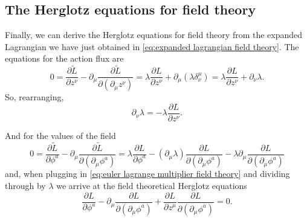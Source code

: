 \documentclass[../main.tex]{subfiles}
\begin{document}
\subsection{The Herglotz equations for field theory}
Finally, we can derive the Herglotz equations for field theory from the expanded
Lagrangian we have just obtained in \cref{eq:expanded lagrangian field theory}. The
equations for the action flux are
\begin{equation*}
	0 = \frac{\partial \tilde{L}}{\partial z^\nu} - \partial_\mu \frac{\partial
	\tilde{L}}{\partial(\partial_\mu z^\nu)} = \lambda \frac{\partial L}{\partial z^\nu} +
	\partial_\mu(\lambda \delta_\nu^\mu) = \lambda \frac{\partial L}{\partial z^\nu} +
	\partial_\nu \lambda.
\end{equation*}
So, rearranging,
\begin{equation} \label{eq:euler lagrange multiplier field theory}
	\partial_\nu \lambda = - \lambda \frac{\partial L}{\partial z^\nu}. 
\end{equation}

And for the values of the field
\begin{equation*}
	0 = \frac{\partial \tilde{L}}{\partial \phi^a} - \partial_\mu \frac{\partial
	\tilde{L}}{\partial(\partial_\mu \phi^a)} = \lambda \frac{\partial L}{\partial \phi^a} -
	(\partial_\mu \lambda) \frac{\partial L}{\partial (\partial_\mu \phi^a) } - \lambda
	\partial_\mu \frac{\partial L}{\partial (\partial_\mu \phi^a) }
\end{equation*}
and, when plugging in \cref{eq:euler lagrange multiplier field theory} and dividing
through by \( \lambda \) we arrive at the field theoretical Herglotz equations
\begin{equation} \label{eq:}
	\frac{\partial L}{\partial \phi^a} - \partial_\mu \frac{\partial
	L}{\partial(\partial_\mu \phi^a)} + \frac{\partial L}{\partial z^\mu} \frac{\partial
L}{\partial(\partial_\mu \phi^a)} = 0. 
\end{equation}


\end{document}
